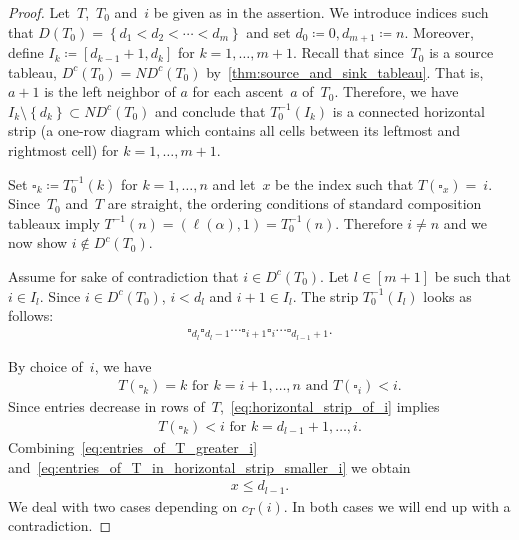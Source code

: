 \documentclass[10pt]{amsart}
\theoremstyle{plain}
\theoremstyle{plain}
\theoremstyle{plain}
\theoremstyle{plain}
\theoremstyle{plain}
\theoremstyle{definition}
\theoremstyle{definition}
\newcommand{\DC}{\operatorname{\mathit{D^c}}}
\newcommand{\ND}{\operatorname{\mathit{ND^c}}}
\newcommand{\set}[1]{\left\{ #1 \right\}}
\newcommand{\cell}{\square}
\begin{document}
\begin{proof}
	Let~$T$,~$T_0$ and~$i$ be given as in the assertion. 
	We introduce indices such that
	$D(T_0)= \set{ d_1 < d_2 < \cdots < d_m}$ and set $d_0 \coloneqq 0, d_{m+1} \coloneqq n$. Moreover,
	 define $I_k\coloneqq [d_{k-1}+1 , d_k]$ for $k= 1, \ldots, m+1$. 
	 Recall that since~$T_0$ is a source tableau, $\DC(T_0)= \ND(T_0)$ by~\cref{thm:source_and_sink_tableau}. 
	 That is, $a+1$ is the left neighbor of $a$ for each ascent~$a$ of~$T_0$. Therefore, we have $I_k\setminus \set{d_k} \subset \ND(T_0)$ and conclude that $T^{-1}_0(I_k)$ is a connected horizontal strip (a one-row diagram which contains all cells between its leftmost and rightmost cell) for $k = 1,\dots,m+1$.
	 
	Set $\cell_k \coloneqq T_0^{-1}(k)$ for $k=1,\dots, n$ and let~$x$ be the index such that $T(\cell_x)=~i$. 
	Since~$T_0$ and~$T$ are straight, the ordering conditions of standard composition tableaux imply $T^{-1}(n)= (\ell(\alpha), 1) = T_0^{-1}(n)$. Therefore $i\neq n$ and we now show $i\notin \DC(T_0)$.	
	
	Assume for sake of contradiction that $i\in \DC(T_0)$.
	Let $l\in [m+1]$ be such that $i\in I_l$. 
	Since $i \in \DC(T_0)$, $i<d_l$ and $i+1\in I_l$. 
	The strip $T^{-1}_0(I_l)$ looks as follows:
	\begin{align}
	\label{eq:horizontal_strip_of_i}
	\cell_{d_{l}} \cell_{d_{l} -1} \cdots \cell_{i+1} \cell_i \cdots \cell_{d_{l-1} + 1}.
	\end{align}	

	By choice of~$i$, we have 
	\begin{align}
	\label{eq:entries_of_T_greater_i}
	\text{$T(\cell_k) = k$ for $k=i+1,\dots, n$ and 	$T(\cell_i) < i$.}
	\end{align}
	Since entries decrease in rows of~$T$,~\eqref{eq:horizontal_strip_of_i} implies 
	\begin{align}
	\label{eq:entries_of_T_in_horizontal_strip_smaller_i}
	T(\cell_k) < i \text{ for } k=d_{l-1}+1,\dots , i. 
	\end{align}
	Combining~\eqref{eq:entries_of_T_greater_i} and~\eqref{eq:entries_of_T_in_horizontal_strip_smaller_i} we obtain
	\begin{align}
	\label{eq:bound_for_x}
	 x\leq d_{l-1}.
	\end{align}
	We deal with two cases depending on $c_T(i)$. 
	In both cases we will end up with a contradiction.
	

\end{proof}
\end{document}
